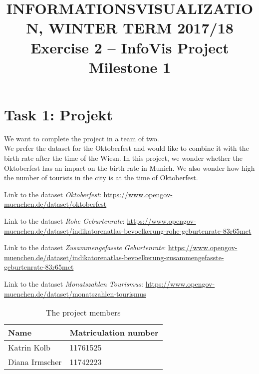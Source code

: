 \documentclass[11pt, twoside, BCOR=8mm, DIV=12]{scrartcl}
\title{{\Large INFORMATIONSVISUALIZATION, WINTER TERM 2017/18} \\ Exercise 2 – InfoVis Project Milestone 1}
\begin{document}
\maketitle
\section*{Task 1: Projekt}
We want to complete the project in a team of two.\\
We prefer the dataset for the Oktoberfest and would like to combine it with the birth rate after the time of the Wiesn. In this project, we wonder whether the Oktoberfest has an impact on the birth rate in Munich.
We also wonder how high the number of tourists in the city is at the time of Oktoberfest.
\begin{description}
\item Link to the dataset \textit{Oktoberfest}: \url{https://www.opengov-muenchen.de/dataset/oktoberfest}
\item Link to the dataset \textit{Rohe Geburtenrate}: \url{https://www.opengov-muenchen.de/dataset/indikatorenatlas-bevoelkerung-rohe-geburtenrate-83r65mct}
\item Link to the dataset \textit{Zusammengefasste Geburtenrate}: 
\url{https://www.opengov-muenchen.de/dataset/indikatorenatlas-bevoelkerung-zusammengefasste-geburtenrate-83r65mct}
\item Link to the dataset \textit{Monatszahlen Tourismus}: \url{https://www.opengov-muenchen.de/dataset/monatszahlen-tourismus}
\end{description}

\begin{table}
\centering

\begin{tabular}{l | l}
Name & Matriculation number \\
 \toprule
Katrin Kolb & 11761525\\
\midrule
Diana Irmscher & 11742223 \\
\bottomrule
\end{tabular}
\caption{The project members}
\end{table}
\end{document}
